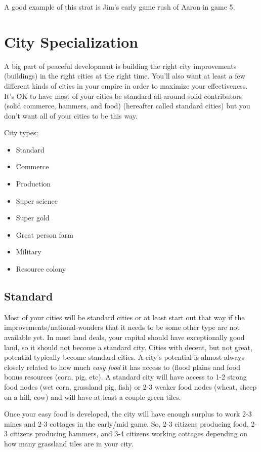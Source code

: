 \documentclass[10pt]{article}
\begin{document}
A good example of this strat is Jim's early game rush of Aaron in game 5.

\section*{City Specialization}

A big part of peaceful development is building the right city improvements (buildings)
in the right cities at the right time. You'll also want at least a few different
kinds of cities in your empire in order to maximize your effectiveness. It's OK
to have most of your cities be standard all-around solid contributors (solid commerce,
hammers, and food) (hereafter called standard cities) but you don't want all of
your cities to be this way.

City types:
\begin{itemize}
\item Standard
\item Commerce
\item Production
\item Super science
\item Super gold
\item Great person farm
\item Military
\item Resource colony
\end{itemize}

\subsection*{Standard}

Most of your cities will be standard cities or at least start out that
way if the improvements/national-wonders that it needs to be some other type
are not available yet. In most land deals, your capital should have exceptionally
good land, so it should not become a standard city. Cities with decent, but not
great, potential typically become standard cities. A city's potential is almost
always closely related to how much \emph{easy food} it has access to (flood plains
and food bonus resources (corn, pig, etc). A standard city will have access to
1-2 strong food nodes (wet corn, grassland pig, fish) or 2-3 weaker food nodes
(wheat, sheep on a hill, cow) and will have at least a couple green tiles.

Once your easy food is developed, the city will have enough surplus to work 2-3
mines and 2-3 cottages in the early/mid game. So, 2-3 citizens producing food,
2-3 citizens producing hammers, and 3-4 citizens working cottages depending on
how many grassland tiles are in your city.
\end{document}
